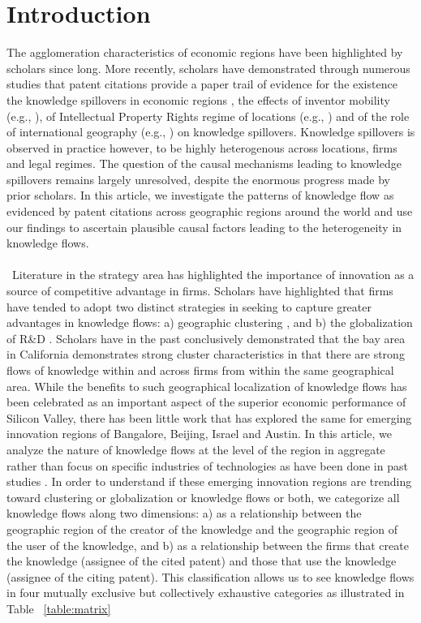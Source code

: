 \documentclass[12pt]{article}
\begin{document}
\section{Introduction}\label{S:Introduction}
The agglomeration characteristics of economic regions have been highlighted by scholars since long\citep{Marshall1890}. More recently, scholars have demonstrated through numerous studies that patent citations provide a paper trail of evidence for the existence the knowledge spillovers in economic regions \citep{Jaffe1993, Almeida1999},  the effects of inventor mobility (e.g., \cite{Almeida1999}), of Intellectual Property Rights regime of locations (e.g., \cite{Zhao2006}) and of the role of international geography (e.g., \cite{Singh2007}) on knowledge spillovers. Knowledge spillovers is observed in practice however, to be highly heterogenous across locations, firms and legal regimes. The question of the causal mechanisms leading to knowledge spillovers remains largely unresolved, despite the enormous progress made by prior scholars. In this article, we investigate the patterns of knowledge flow as evidenced by patent citations across geographic regions around the world and use our findings to ascertain plausible causal factors leading to the heterogeneity in knowledge flows.
\\\\\
Literature in the strategy area has highlighted the importance of innovation as a source of competitive advantage in firms. Scholars have highlighted that firms have tended to adopt two distinct strategies in seeking to capture greater advantages in knowledge flows: a) geographic clustering \citep{Porter2003}, and b) the globalization of R\&D \citep{Almeida1996}. Scholars have in the past conclusively demonstrated that the bay area in California  demonstrates strong  cluster characteristics in that there are strong flows of knowledge within and across firms from within the same geographical area. While the benefits to such geographical localization of knowledge flows \citep{Porter2003} has been celebrated as an important aspect of the superior economic performance of Silicon Valley, there has been little work that has explored the same for  emerging innovation regions of Bangalore, Beijing, Israel and Austin. In this article, we analyze the nature of knowledge flows at the level of the region in aggregate rather than focus on specific industries of technologies as have been done in past studies \citep{Lecocq2016}.  In order to understand if these emerging innovation regions are trending toward clustering \citep{Jaffe1993} or globalization or knowledge flows or both, we categorize all knowledge flows along two dimensions: a) as a relationship between the geographic region of the creator of the knowledge and the geographic region of the user of the knowledge, and b) as a relationship between the firms that create the knowledge (assignee of the cited patent) and those that use the knowledge (assignee of the citing patent). This classification allows us to see knowledge flows in four mutually exclusive but collectively exhaustive categories as illustrated in Table ~\ref{table:matrix}\\
\end{document}
